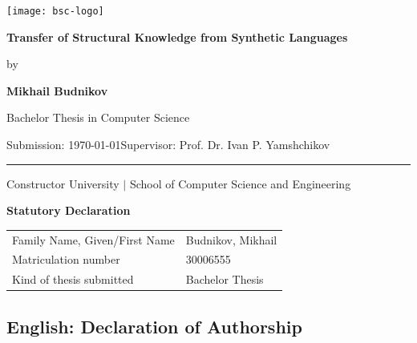 \documentclass[a4paper, 11pt, oneside]{article}
\newcommand{\mylastname}{Budnikov}
\newcommand{\myfirstname}{Mikhail}
\newcommand{\mynumber}{30006555}
\newcommand{\myname}{\myfirstname{} \mylastname{}}
\newcommand{\mytitle}{Transfer of Structural Knowledge from Synthetic Languages}
\newcommand{\mysupervisor}{Prof. Dr. Ivan P. Yamshchikov}
\begin{document}

	\thispagestyle{empty}

	\begin{flushright}
		\texttt{[image: bsc-logo]}
	\end{flushright}
	\vspace*{40mm}
	\begin{center}
		\huge \textbf{\mytitle}
	\end{center}
	\vspace*{4mm}
	\begin{center}
		\Large by
	\end{center}
	\vspace*{4mm}
	\begin{center}
		\LARGE \textbf{\myname}
	\end{center}
	\vspace*{20mm}
	\begin{center}
		\Large Bachelor Thesis in Computer Science
	\end{center}
	\vfill
	\begin{flushleft}
		\large Submission: \today \hfill Supervisor: \mysupervisor \\ \rule{\textwidth}{1pt}
	\end{flushleft}
	\begin{center}
		Constructor University $|$ School of Computer Science and Engineering
	\end{center}

	\newpage
	\thispagestyle{empty}

	\begin{center}
		\Large \textbf{Statutory Declaration}
		\vspace*{8mm}
	\end{center}

	\begin{center}
		\begin{tabular}{|l|p{85mm}|}
			\hline
			Family Name, Given/First Name & \mylastname, \myfirstname \\
			Matriculation number          & \mynumber                 \\
			Kind of thesis submitted      & Bachelor Thesis           \\
			\hline
		\end{tabular}
		\vspace*{8mm}
	\end{center}

	\subsection*{English: Declaration of Authorship}
\end{document}
